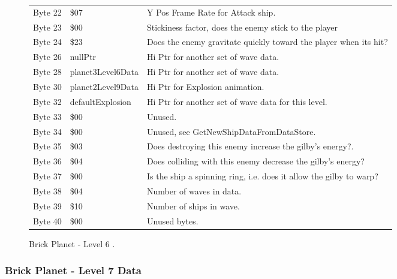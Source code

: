 \begin{figure}[H]
{\begin{adjustbox}{width=12cm}
\begin{tabular}{lll}
 Byte 22 & \$07                     & Y Pos Frame Rate for Attack ship.                                  \\
 Byte 23 & \$00                     & Stickiness factor, does the enemy stick to the player              \\
 Byte 24 & \$23                     & Does the enemy gravitate quickly toward the player when its hit?   \\
 Byte 26 & nullPtr                 & Hi Ptr for another set of wave data.                               \\
 Byte 28 & planet3Level6Data       & Hi Ptr for another set of wave data.                               \\
 Byte 30 & planet2Level9Data       & Hi Ptr for Explosion animation.                                    \\
 Byte 32 & defaultExplosion        & Hi Ptr for another set of wave data for this level.                \\
 Byte 33 & \$00                     & Unused.                                                            \\
 Byte 34 & \$00                     & Unused, see GetNewShipDataFromDataStore.                           \\
 Byte 35 & \$03                     & Does destroying this enemy increase the gilby's energy?.           \\
 Byte 36 & \$04                     & Does colliding with this enemy decrease the gilby's energy?        \\
 Byte 37 & \$00                     & Is the ship a spinning ring, i.e. does it allow the gilby to warp? \\
 Byte 38 & \$04                     & Number of waves in data.                                           \\
 Byte 39 & \$10                     & Number of ships in wave.                                           \\
 Byte 40 & \$00                     & Unused bytes.                                                      \\
\bottomrule
\end{tabular}

  \end{adjustbox}

  }\caption*{Brick Planet - Level 6
.}
\end{figure}

\clearpage
\subsubsection{Brick Planet - Level 7 Data}


